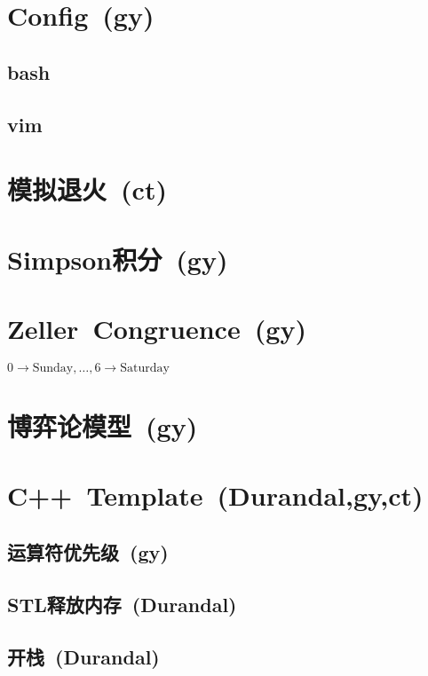 \section{Config\ \small(gy)}
    \subsection*{bash}
    \subsection*{vim}

\section{模拟退火\ \small(ct)}

\section{Simpson积分\ \small(gy)}

\section{Zeller\ Congruence\ \small(gy)}
    $ 0 \to \text{Sunday} , \dots , 6 \to \text{Saturday} $

\section{博弈论模型\ \small(gy)}
    

\section{C++\ Template\ \small(Durandal,gy,ct)}
    \subsection*{运算符优先级\ \small(gy)}
        
    \subsection*{STL释放内存\ \small(Durandal)}
    \subsection*{开栈\ \small(Durandal)}
